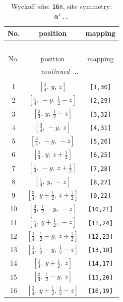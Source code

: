 \documentclass[fleqn,8pt]{jsarticle}
\begin{document}
\renewcommand{\arraystretch}{1.2}
\begin{longtable}{ccc}
\caption{Wyckoff site: {\tt 16n}, site symmetry: {\tt m'..}}
 \\
 \hline \hline
No. & position & mapping \\ \hline \endfirsthead

\multicolumn{2}{l}{\tablename\ \thetable{}} \\
 \hline \hline
No. & position & mapping \\ \hline \endhead

 \hline \hline
\multicolumn{2}{r}{\footnotesize\it continued ...} \\ \endfoot

 \hline \hline
\multicolumn{2}{r}{} \\ \endlastfoot

1 & $\left[ \frac{1}{4},\, y,\, z \right]$ & {\tt [1,30]} \\ \hline
2 & $\left[ \frac{1}{4},\, - y,\, \frac{1}{2} - z \right]$ & {\tt [2,29]} \\ \hline
3 & $\left[ \frac{3}{4},\, y,\, \frac{1}{2} - z \right]$ & {\tt [3,32]} \\ \hline
4 & $\left[ \frac{3}{4},\, - y,\, z \right]$ & {\tt [4,31]} \\ \hline
5 & $\left[ \frac{3}{4},\, - y,\, - z \right]$ & {\tt [5,26]} \\ \hline
6 & $\left[ \frac{3}{4},\, y,\, z + \frac{1}{2} \right]$ & {\tt [6,25]} \\ \hline
7 & $\left[ \frac{1}{4},\, - y,\, z + \frac{1}{2} \right]$ & {\tt [7,28]} \\ \hline
8 & $\left[ \frac{1}{4},\, y,\, - z \right]$ & {\tt [8,27]} \\ \hline
9 & $\left[ \frac{3}{4},\, y + \frac{1}{2},\, z + \frac{1}{2} \right]$ & {\tt [9,22]} \\ \hline
10 & $\left[ \frac{3}{4},\, \frac{1}{2} - y,\, - z \right]$ & {\tt [10,21]} \\ \hline
11 & $\left[ \frac{1}{4},\, y + \frac{1}{2},\, - z \right]$ & {\tt [11,24]} \\ \hline
12 & $\left[ \frac{1}{4},\, \frac{1}{2} - y,\, z + \frac{1}{2} \right]$ & {\tt [12,23]} \\ \hline
13 & $\left[ \frac{1}{4},\, \frac{1}{2} - y,\, \frac{1}{2} - z \right]$ & {\tt [13,18]} \\ \hline
14 & $\left[ \frac{1}{4},\, y + \frac{1}{2},\, z \right]$ & {\tt [14,17]} \\ \hline
15 & $\left[ \frac{3}{4},\, \frac{1}{2} - y,\, z \right]$ & {\tt [15,20]} \\ \hline
16 & $\left[ \frac{3}{4},\, y + \frac{1}{2},\, \frac{1}{2} - z \right]$ & {\tt [16,19]} \\
\end{longtable}
\end{document}
